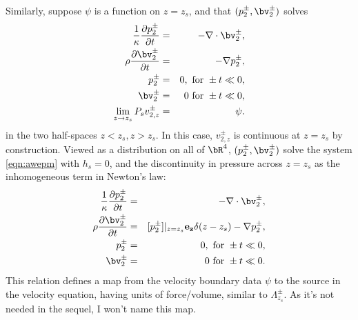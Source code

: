 Similarly, suppose $\psi$ is a function on $z=z_s$, and that
$(p^{\pm}_2,\bv^{\pm}_2)$ solves
\begin{eqnarray}
\label{eqn:awe2}
  \frac{1}{\kappa}\frac{\partial p^{\pm}_2}{\partial t} & = & - \nabla \cdot \bv^{\pm}_2, \nonumber \\
  \rho\frac{\partial \bv^{\pm}_2}{\partial t} & = & - \nabla p^{\pm}_2,\nonumber \\
  p^{\pm}_2 & =& 0,  \mbox{ for } \pm t \ll 0,\nonumber\\ 
  \bv^{\pm}_2 & = & 0 \mbox{ for } \pm t \ll 0,\nonumber\\
  \lim_{z \rightarrow z_s} P_sv^{\pm}_{2,z} &=& \psi.
\end{eqnarray}
in the two half-spaces $z<z_s, z > z_s$. In this case, $v^{\pm}_{2,z}$
is continuous at $z=z_s$ by construction. Viewed as a
distribution on all of $\bR^4$, $(p^{\pm}_2,\bv^{\pm}_2)$ solve the
system \ref{eqn:awepm} with $h_s=0$, and the discontinuity in pressure
across $z=z_s$ as the inhomogeneous term in Newton's law:
\begin{eqnarray}
\label{eqn:sawe2}
  \frac{1}{\kappa}\frac{\partial p^{\pm}_2}{\partial t} & = &
                                                        - \nabla \cdot \bv^{\pm}_2, \nonumber \\
  \rho\frac{\partial \bv^{\pm}_2}{\partial t} & = & 
                                                    [p^{\pm}_2]|_{z=z_s}{\bf e_z}\delta(z-z_s) - \nabla p^{\pm}_2,\nonumber \\
  p^{\pm}_2 & =& 0,  \mbox{ for } \pm t \ll 0,\nonumber\\ 
  \bv^{\pm}_2 & = & 0 \mbox{ for } \pm t \ll 0.
\end{eqnarray}
This relation defines a map from the velocity boundary data $\psi$ to
the source in the velocity equation, having units of force/volume,
similar to $\Lambda^{\pm}_{z_s}$. As it's not needed in the sequel, I
won't name this map.

